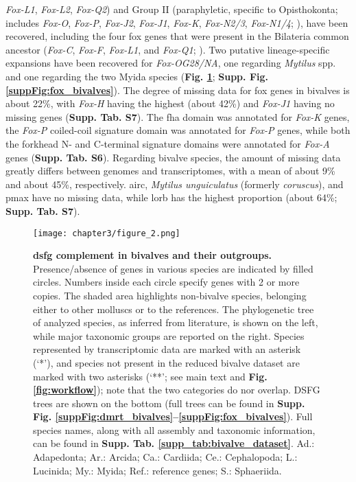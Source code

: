 \documentclass[../main.tex]{subfiles}
\begin{document}
\textit{Fox-L1}, \textit{Fox-L2}, \textit{Fox-Q2}) and Group II (paraphyletic, specific to Opisthokonta; includes \textit{Fox-O}, \textit{Fox-P}, \textit{Fox-J2}, \textit{Fox-J1}, \textit{Fox-K}, \textit{Fox-N2/3}, \textit{Fox-N1/4}; \textbf{\cite{larroux2008genesis}}), have been recovered, including the four \gls{fox} genes that were present in the Bilateria common ancestor (\textit{Fox-C}, \textit{Fox-F}, \textit{Fox-L1}, and \textit{Fox-Q1}; \textbf{\cite{shimeld2010clustered}}). Two putative lineage-specific expansions have been recovered for \textit{Fox-OG28/NA}, one regarding \textit{Mytilus} spp. and one regarding the two Myida species (\textbf{Fig. \ref{fig:DSFG_bivalveCompilation}}; \textbf{Supp. Fig. \ref{suppFig:fox_bivalves}}). The degree of missing data for \gls{fox} genes in bivalves is about 22\%, with \textit{Fox-H} having the highest (about 42\%) and \textit{Fox-J1} having no missing genes (\textbf{Supp. Tab. S7}). The \gls{fha} domain was annotated for \textit{Fox-K} genes, the \textit{Fox-P} coiled-coil signature domain was annotated for \textit{Fox-P} genes, while both the forkhead N- and C-terminal signature domains were annotated for \textit{Fox-A} genes (\textbf{Supp. Tab. S6}).
Regarding bivalve species, the amount of missing data greatly differs between genomes and transcriptomes, with a mean of about 9\% and about 45\%, respectively. \gls{airc}, \textit{Mytilus unguiculatus} (formerly \textit{coruscus}), and \gls{pmax} have no missing data, while \gls{lorb} has the highest proportion (about 64\%; \textbf{Supp. Tab. S7}).


\begin{figure}
	\centering
	\texttt{[image: chapter3/figure\_2.png]}
	\captionsetup{width=\textwidth}
	\caption{
		\textbf{\gls{dsfg} complement in bivalves and their outgroups.} Presence/absence of genes in various species are indicated by filled circles. Numbers inside each circle specify genes with 2 or more copies. The shaded area highlights non-bivalve species, belonging either to other molluscs or to the references. The phylogenetic tree of analyzed species, as inferred from literature, is shown on the left, while major taxonomic groups are reported on the right. Species represented by transcriptomic data are marked with an asterisk (‘*’), and species not present in the reduced bivalve dataset are marked with two asterisks (‘**’; see main text and \textbf{Fig. \ref{fig:workflow}}); note that the two categories do nor overlap. DSFG trees are shown on the bottom (full trees can be found in \textbf{Supp. Fig. \ref{suppFig:dmrt_bivalves}--\ref{suppFig:fox_bivalves}}). Full species names, along with all assembly and taxonomic information, can be found in \textbf{Supp. Tab. \ref{supp_tab:bivalve_dataset}}.  Ad.: Adapedonta; Ar.: Arcida; Ca.: Cardiida; Ce.: Cephalopoda; L.: Lucinida; My.: Myida; Ref.: reference genes; S.: Sphaeriida.
	}
	\label{fig:DSFG_bivalveCompilation}
\end{figure}
\end{document}
